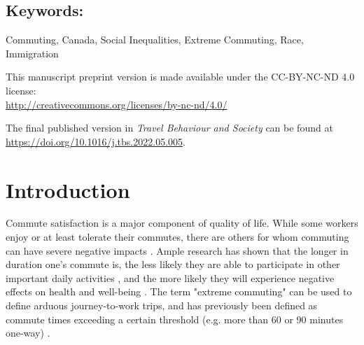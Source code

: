 \documentclass[10 pt,letterpaper]{article}
\begin{document}
	
	
	\subsection*{{Keywords:}}
	\vspace{-5mm}
	Commuting, Canada, Social Inequalities, Extreme Commuting, Race, Immigration
	
	
	\vspace{15mm}
	
	This manuscript preprint version is made available under the CC-BY-NC-ND 4.0 license: \\
	\url{http://creativecommons.org/licenses/by-nc-nd/4.0/}
	
	The final published version in \textit{Travel Behaviour and Society} can be found at
	\url{https://doi.org/10.1016/j.tbs.2022.05.005}. 
	
	\normalsize
	


\vspace{4mm}

\vspace{4mm}



	


\newpage

\section{Introduction}

Commute satisfaction is a major component of quality of life. While some workers enjoy or at least tolerate their commutes, there are others for whom commuting can have severe negative impacts \cite{novaco_transportation_1979,chatterjee_commuting_2020}. Ample research has shown that the longer in duration one's commute is, the less likely they are able to participate in other important daily activities \cite{farber_running_2011, hilbrecht_highway_2014}, and the more likely they will experience negative effects on health and well-being \cite{morris_are_2015,st-louis_happy_2014}. The term "extreme commuting" can be used to define arduous journey-to-work trips, and has previously been defined as commute times exceeding a certain threshold (e.g. more than 60 or 90 minutes one-way) \cite{marion_comparison_2007,maoh_determinants_2012-1,vincent-geslin_determinants_2016,bai_exploring_2020}.
\end{document}
